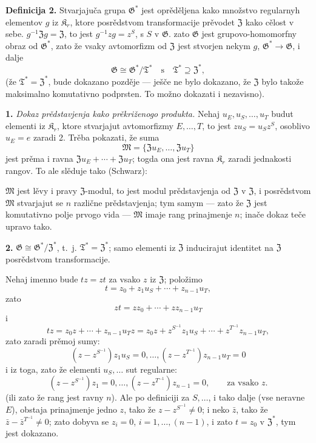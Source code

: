 \documentclass[11pt]{article}
\newcommand{\foreign}[1]{#1}
\begin{document}
\noindent\textbf{Definicija 2.} Stvarjajuča grupa \(\mathfrak G^*\) jest oprěděljena kako množstvo regularnyh elementov \(g\) iz \(\mathfrak K_r\), ktore posrědstvom transformacije prěvodet \(\mathfrak Z\) kako cělost v sebe. \(g^{-1}\mathfrak Zg=\mathfrak Z\), to jest \(g^{-1}zg=z^S\), s \(S\) v \(\mathfrak G\). zato \(\mathfrak G\) jest grupovo-homomorfny obraz od \(\mathfrak G^*\), zato že vsaky avtomorfizm od \(\mathfrak Z\) jest stvorjen nekym \(g\), \(\mathfrak G^*\to\mathfrak G\), i dalje
\[
\mathfrak G\cong\mathfrak G^*/\mathfrak T^*
\quad\text{s}\quad
\mathfrak T^*\supseteq\mathfrak Z^*,
\]
(že \(\mathfrak T^*=\mathfrak Z^*\), bude dokazano pozděje --- ješče ne bylo dokazano, že \(\mathfrak Z\) bylo takože maksimalno komutativno podprsten. To možno dokazati i nezavisno).

\noindent\textbf{1.} \emph{Dokaz prědstavjenja kako prěkriženogo produkta.} Nehaj \(u_E,u_S,\ldots,u_T\) budut elementi iz \(\mathfrak K_r\), ktore stvarjajut avtomorfizmy \(E,\ldots,T\), to jest \(zu_S=u_Sz^S\), osoblivo \(u_E=e\) zaradi 2. Trěba pokazati, že suma
\[
\mathfrak M=\{\mathfrak Zu_E,\ldots,\mathfrak Zu_T\}
\]
jest prěma i ravna \(\mathfrak Zu_E+\cdots+\mathfrak Zu_T\); togda ona jest ravna \(\mathfrak K_r\) zaradi jednakosti rangov. To ale slěduje tako (\foreign{Schwarz}):

\(\mathfrak M\) jest lěvy i pravy \(\mathfrak Z\)-modul, to jest modul prědstavjenja od \(\mathfrak Z\) v \(\mathfrak Z\), i posrědstvom \(\mathfrak M\) stvarjajut se \(n\) različne prědstavjenja; tym samym --- zato že \(\mathfrak Z\) jest komutativno polje prvogo vida --- \(\mathfrak M\) imaje rang prinajmenje \(n\); inače dokaz teče upravo tako.

\noindent\textbf{2.} \(\mathfrak G\cong\mathfrak G^*/\mathfrak Z^*\), t.~j. \(\mathfrak T^*=\mathfrak Z^*\); samo elementi iz \(\mathfrak Z\) inducirajut identitet na \(\mathfrak Z\) posrědstvom transformacije.

Nehaj imenno bude \(tz=zt\) za vsako \(z\) iz \(\mathfrak Z\); položimo
\[
t=z_0+z_1u_S+\cdots+z_{n-1}u_T,
\]
zato
\[
zt=zz_0+\cdots+zz_{n-1}u_T
\]
i
\[
tz=z_0z+\cdots+z_{n-1}u_Tz
=z_0z+z^{S^{-1}}z_1u_S+\cdots+z^{T^{-1}}z_{n-1}u_T,
\]
zato zaradi prěmoj sumy:
\[
(z-z^{S^{-1}})z_1u_S=0,\ldots,
(z-z^{T^{-1}})z_{n-1}u_T=0
\]
i iz toga, zato že elementi \(u_S,\ldots\) sut regularne:
\[
(z-z^{S^{-1}})z_1=0,\ldots,
(z-z^{T^{-1}})z_{n-1}=0,
\qquad\text{za vsako }z.
\]
(ili zato že rang jest ravny \(n\)). Ale po definiciji za \(S,\ldots\), i tako dalje (vse neravne \(E\)), obstaja prinajmenje jedno \(z\), tako že \(z-z^{S^{-1}}\neq0\); i neko \(\bar z\), tako že \(\bar z-\bar z^{T^{-1}}\neq0\); zato dobyva se \(z_i=0\), \(i=1,\ldots,(n-1)\), i zato \(t=z_0\) v \(\mathfrak Z^*\), tym jest dokazano.
\end{document}
